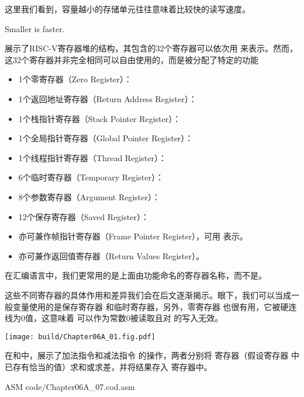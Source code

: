 这里我们看到，容量越小的存储单元往往意味着比较快的读写速度。
\begin{BoxDesignPrinciple}[越小越快]
    \centering
    Smaller is faster.
\end{BoxDesignPrinciple}
展示了RISC-V寄存器堆的结构，其包含的32个寄存器可以依次用 来表示。然而，这32个寄存器并非完全相同可以自由使用的，而是被分配了特定的功能
\begin{itemize}
    \item 1个零寄存器（Zero Register）：
    \item 1个返回地址寄存器（Return Address Register）：
    \item 1个栈指针寄存器（Stack Pointer Register）：
    \item 1个全局指针寄存器（Global Pointer Register）：
    \item 1个线程指针寄存器（Thread Register）：
    \item 6个临时寄存器（Temporary Register）：
    \item 8个参数寄存器（Argument Register）：
    \item 12个保存寄存器（Saved Register）：
    \item {} 亦可兼作帧指针寄存器（Frame Pointer Register），可用 表示。
    \item {} 亦可兼作返回值寄存器（Return Values Register）。
\end{itemize}

在汇编语言中，我们更常用的是上面由功能命名的寄存器名称，而不是。

这些不同寄存器的具体作用和差异我们会在后文逐渐揭示。眼下，我们可以当成一般变量使用的是保存寄存器 和临时寄存器，另外，零寄存器 也很有用，它被硬连线为$0$值，这意味着 可以作为常数$0$被读取且对 的写入无效。

\begin{Figure}
    \texttt{[image: build/Chapter06A\_01.fig.pdf]}
\end{Figure}

在和中，展示了加法指令和减法指令 的操作，两者分别将 寄存器（假设寄存器 中已存有恰当的值）求和或求差，并将结果存入 寄存器中。
\begin{Code}{ASM}
    code/Chapter06A_07.cod.asm
\end{Code}

